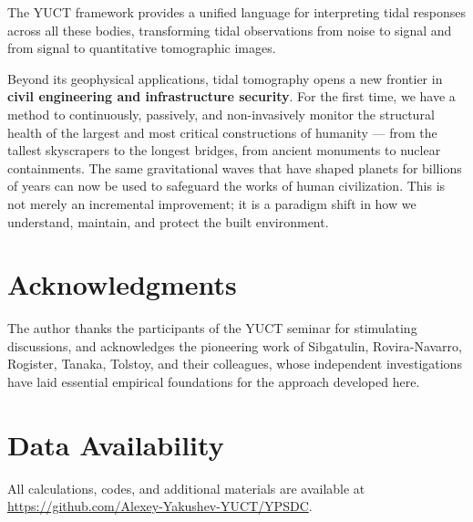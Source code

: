 \documentclass[12pt,a4paper]{article}
\theoremstyle{remark}
\begin{document}
	The YUCT framework provides a unified language for interpreting tidal responses across all these bodies, transforming tidal observations from noise to signal and from signal to quantitative tomographic images.
	
	Beyond its geophysical applications, tidal tomography opens a new frontier in \textbf{civil engineering and infrastructure security}. For the first time, we have a method to continuously, passively, and non-invasively monitor the structural health of the largest and most critical constructions of humanity — from the tallest skyscrapers to the longest bridges, from ancient monuments to nuclear containments. The same gravitational waves that have shaped planets for billions of years can now be used to safeguard the works of human civilization. This is not merely an incremental improvement; it is a paradigm shift in how we understand, maintain, and protect the built environment.
	
	\section*{Acknowledgments}
	
	The author thanks the participants of the YUCT seminar for stimulating discussions, and acknowledges the pioneering work of Sibgatulin, Rovira-Navarro, Rogister, Tanaka, Tolstoy, and their colleagues, whose independent investigations have laid essential empirical foundations for the approach developed here.
	
	\section*{Data Availability}
	
	All calculations, codes, and additional materials are available at \url{https://github.com/Alexey-Yakushev-YUCT/YPSDC}.
	
\end{document}
